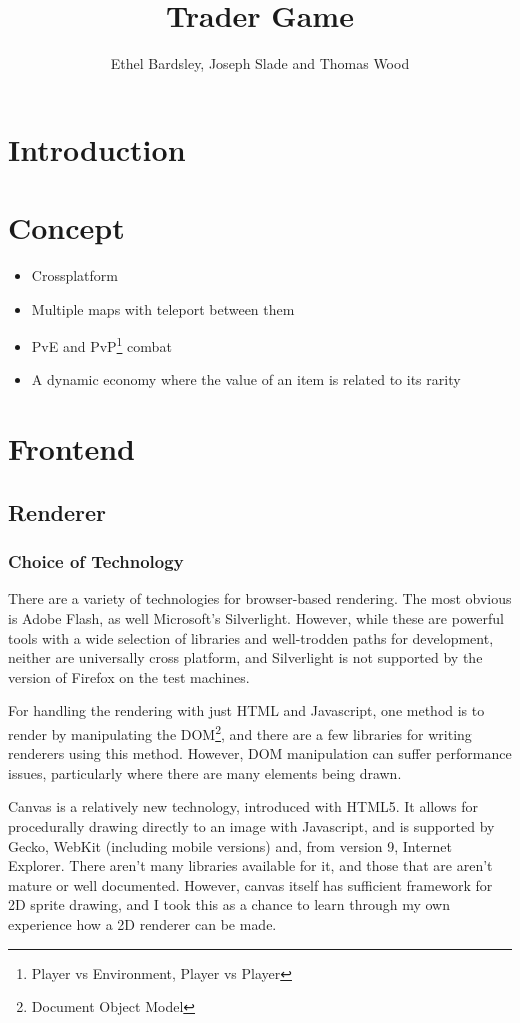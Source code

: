 \documentclass[12pt]{amsart}
\title{Trader Game}
\author{Ethel Bardsley, Joseph Slade and Thomas Wood}
\begin{document}
\maketitle

\section{Introduction}
\section{Concept}
  \begin{itemize}
    \item Crossplatform
    \item Multiple maps with teleport between them
    \item PvE and PvP\footnote{Player vs Environment, Player vs Player} combat
    \item A dynamic economy where the value of an item is related to its rarity
  \end{itemize}

\section{Frontend}
  \subsection{Renderer}
    \subsubsection{Choice of Technology}
      \begin{flushleft}
        There are a variety of technologies for browser-based rendering. The
        most obvious is Adobe Flash, as well Microsoft's Silverlight. However,
        while these are powerful tools with a wide selection of libraries and
        well-trodden paths for development, neither are universally cross
        platform, and Silverlight is not supported by the version of Firefox
        on the test machines.

        For handling the rendering with just HTML and Javascript, one method is
        to render by manipulating the DOM\footnote{Document Object Model}, and
        there are a few libraries for writing renderers using this method.
        However, DOM manipulation can suffer performance issues, particularly
        where there are many elements being drawn.

        Canvas is a relatively new technology, introduced with HTML5. It allows
        for procedurally drawing directly to an image with Javascript, and is
        supported by Gecko, WebKit (including mobile versions) and, from version
        9, Internet Explorer. There aren't many libraries available for it, and
        those that are aren't mature or well documented. However, canvas itself
        has sufficient framework for 2D sprite drawing, and I took this as a
        chance to learn through my own experience how a 2D renderer can be made.
      \end{flushleft}
\end{document}
